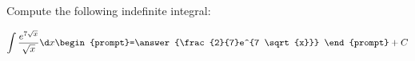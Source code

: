 \documentclass{ximera}
\author{Jim Talamo}
\begin{document}
\begin{exercise}
Compute the following indefinite integral:

\[
\int \frac{e^{7\sqrt{x}}}{\sqrt{x}} \d x 
\begin{prompt}=\answer{\frac{2}{7}e^{7 \sqrt{x}}} \end{prompt}+C
\]
\end{exercise}
\end{document}
